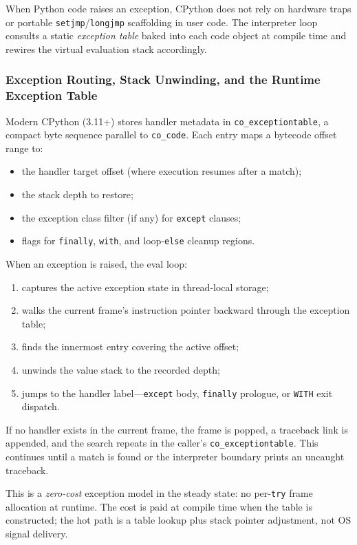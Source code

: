 \documentclass[a4paper,twoside]{report}
\begin{document}
When Python code raises an exception, CPython does not rely on hardware traps or portable \texttt{setjmp}/\texttt{longjmp} scaffolding in user code. The interpreter loop consults a static \emph{exception table} baked into each code object at compile time and rewires the virtual evaluation stack accordingly.

\subsubsection{Exception Routing, Stack Unwinding, and the Runtime Exception Table}

Modern CPython (3.11+) stores handler metadata in \texttt{co\_exceptiontable}, a compact byte sequence parallel to \texttt{co\_code}. Each entry maps a bytecode offset range to:

\begin{itemize}
    \item the handler target offset (where execution resumes after a match);
    \item the stack depth to restore;
    \item the exception class filter (if any) for \texttt{except} clauses;
    \item flags for \texttt{finally}, \texttt{with}, and loop-\texttt{else} cleanup regions.
\end{itemize}

When an exception is raised, the eval loop:

\begin{enumerate}
    \item captures the active exception state in thread-local storage;
    \item walks the current frame's instruction pointer backward through the exception table;
    \item finds the innermost entry covering the active offset;
    \item unwinds the value stack to the recorded depth;
    \item jumps to the handler label---\texttt{except} body, \texttt{finally} prologue, or \texttt{WITH} exit dispatch.
\end{enumerate}

If no handler exists in the current frame, the frame is popped, a traceback link is appended, and the search repeats in the caller's \texttt{co\_exceptiontable}. This continues until a match is found or the interpreter boundary prints an uncaught traceback.

This is a \emph{zero-cost} exception model in the steady state: no per-\texttt{try} frame allocation at runtime. The cost is paid at compile time when the table is constructed; the hot path is a table lookup plus stack pointer adjustment, not OS signal delivery.
\end{document}
